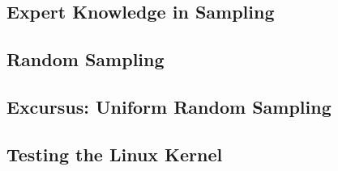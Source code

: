 \subsection{Expert Knowledge in Sampling}

\subsection{Random Sampling}

\subsection{Excursus: Uniform Random Sampling}

\subsection{Testing the Linux Kernel}




